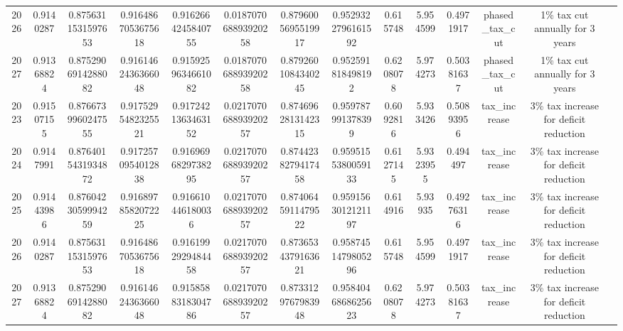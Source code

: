 \begin{sidewaystable}
\begin{tabular}{|c|c|c|c|c|c|c|c|c|c|c|c|c|c|}
2026 & 0.9140287 & 0.8756311531597653 & 0.9164867053675618 & 0.9162664245840755 & 0.018707068893920258 & 0.8796005695519917 & 0.9529322796161592 & 0.615748 & 5.954599 & 0.4971917 & phased\_tax\_cut & 1\% tax cut annually for 3 years \\
2027 & 0.91368824 & 0.8752906914288082 & 0.9161462436366048 & 0.9159259634661082 & 0.018707068893920258 & 0.8792601084340245 & 0.952591818498192 & 0.6208078 & 5.974273 & 0.50381637 & phased\_tax\_cut & 1\% tax cut annually for 3 years \\
\hline
2023 & 0.91507155 & 0.8766739960247555 & 0.9175295482325521 & 0.9172421363463152 & 0.021707068893920257 & 0.8746962813142315 & 0.959787991378399 & 0.6092816 & 5.933426 & 0.50893956 & tax\_increase & 3\% tax increase for deficit reduction \\
2024 & 0.9147991 & 0.8764015431934872 & 0.9172570954012838 & 0.9169696829738295 & 0.021707068893920257 & 0.8744238279417458 & 0.9595155380059133 & 0.6127145 & 5.9323955 & 0.494497 & tax\_increase & 3\% tax increase for deficit reduction \\
2025 & 0.91443986 & 0.8760423059994259 & 0.9168978582072225 & 0.916610446180036 & 0.021707068893920257 & 0.8740645911479522 & 0.9591563012121197 & 0.614916 & 5.93935 & 0.49276316 & tax\_increase & 3\% tax increase for deficit reduction \\
2026 & 0.9140287 & 0.8756311531597653 & 0.9164867053675618 & 0.9161992929484458 & 0.021707068893920257 & 0.8736534379163621 & 0.9587451479805296 & 0.615748 & 5.954599 & 0.4971917 & tax\_increase & 3\% tax increase for deficit reduction \\
2027 & 0.91368824 & 0.8752906914288082 & 0.9161462436366048 & 0.9158588318304786 & 0.021707068893920257 & 0.8733129767983948 & 0.9584046868625623 & 0.6208078 & 5.974273 & 0.50381637 & tax\_increase & 3\% tax increase for deficit reduction \\
\hline
\end{tabular}
\label{tab:scenario_forecasts}
\end{sidewaystable}













